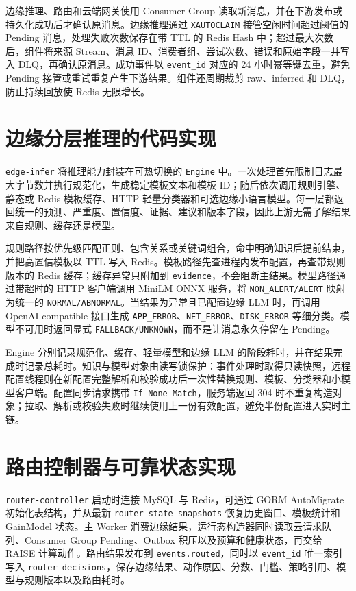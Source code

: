 边缘推理、路由和云端网关使用 Consumer Group 读取新消息，并在下游发布或持久化成功后才确认原消息。边缘推理通过 \texttt{XAUTOCLAIM} 接管空闲时间超过阈值的 Pending 消息，处理失败次数保存在带 TTL 的 Redis Hash 中；超过最大次数后，组件将来源 Stream、消息 ID、消费者组、尝试次数、错误和原始字段一并写入 DLQ，再确认原消息。成功事件以 \texttt{event\_id} 对应的 24 小时幂等键去重，避免 Pending 接管或重试重复产生下游结果。组件还周期裁剪 raw、inferred 和 DLQ，防止持续回放使 Redis 无限增长。

\section{边缘分层推理的代码实现}
\texttt{edge-infer} 将推理能力封装在可热切换的 \texttt{Engine} 中。一次处理首先限制日志最大字节数并执行规范化，生成稳定模板文本和模板 ID；随后依次调用规则引擎、静态或 Redis 模板缓存、HTTP 轻量分类器和可选边缘小语言模型。每一层都返回统一的预测、严重度、置信度、证据、建议和版本字段，因此上游无需了解结果来自规则、缓存还是模型。

规则路径按优先级匹配正则、包含关系或关键词组合，命中明确知识后提前结束，并把高置信模板以 TTL 写入 Redis。模板路径先查进程内发布配置，再查带规则版本的 Redis 缓存；缓存异常只附加到 \texttt{evidence}，不会阻断主结果。模型路径通过带超时的 HTTP 客户端调用 MiniLM ONNX 服务，将 \texttt{NON\_ALERT/ALERT} 映射为统一的 \texttt{NORMAL/ABNORMAL}。当结果为异常且已配置边缘 LLM 时，再调用 OpenAI-compatible 接口生成 \texttt{APP\_ERROR}、\texttt{NET\_ERROR}、\texttt{DISK\_ERROR} 等细分类。模型不可用时返回显式 \texttt{FALLBACK/UNKNOWN}，而不是让消息永久停留在 Pending。

Engine 分别记录规范化、缓存、轻量模型和边缘 LLM 的阶段耗时，并在结果完成时记录总耗时。知识与模型对象由读写锁保护：事件处理时取得只读快照，远程配置线程则在新配置完整解析和校验成功后一次性替换规则、模板、分类器和小模型客户端。配置同步请求携带 \texttt{If-None-Match}，服务端返回 304 时不重复构造对象；拉取、解析或校验失败时继续使用上一份有效配置，避免半份配置进入实时主链。

\section{路由控制器与可靠状态实现}
\texttt{router-controller} 启动时连接 MySQL 与 Redis，可通过 GORM AutoMigrate 初始化表结构，并从最新 \texttt{router\_state\_snapshots} 恢复历史窗口、模板统计和 GainModel 状态。主 Worker 消费边缘结果，运行态构造器同时读取云请求队列、Consumer Group Pending、Outbox 积压以及预算和健康状态，再交给 RAISE 计算动作。路由结果发布到 \texttt{events.routed}，同时以 \texttt{event\_id} 唯一索引写入 \texttt{router\_decisions}，保存边缘结果、动作原因、分数、门槛、策略引用、模型与规则版本以及路由耗时。

